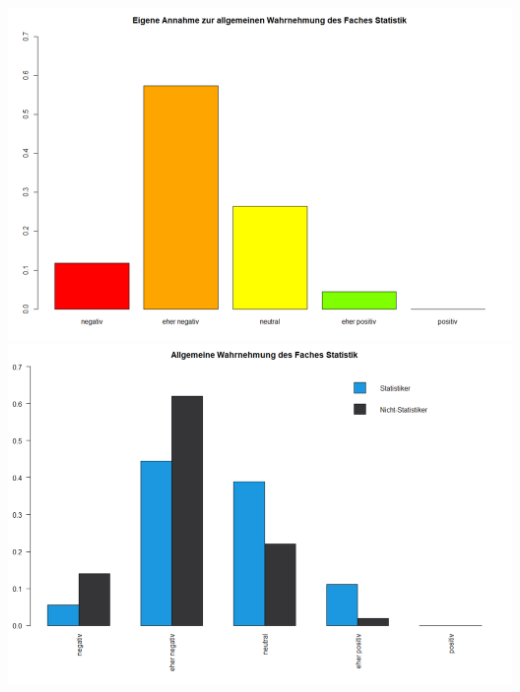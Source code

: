 \documentclass[12pt,a4paper,titlepage=true,parskip,ngerman]{scrartcl}
\begin{document}
\hspace{-2cm}
\includegraphics[scale=0.3]{barplot_Wahrnehmung}
\includegraphics[scale=0.3]{(nicht)-statis_barplot_Wahrnehmung}\\

\vspace{-0.4cm}
\end{document}
